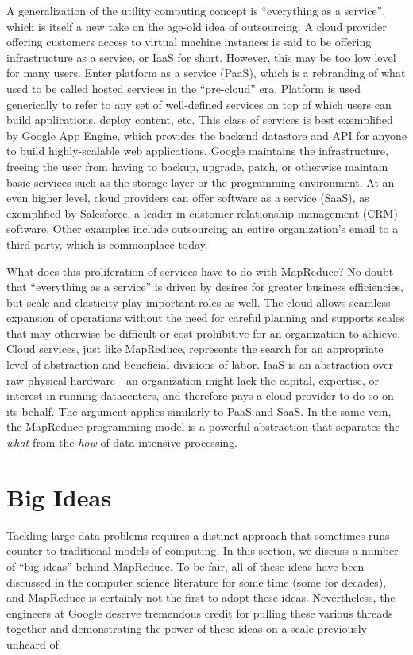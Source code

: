 A generalization of the utility computing concept is ``everything as a
service'', which is itself a new take on the age-old idea of
outsourcing.  A cloud provider offering customers access to virtual
machine instances is said to be offering infrastructure as a service,
or IaaS for short.  However, this may be too low level for many users.
Enter platform as a service (PaaS), which is a rebranding of what used
to be called hosted services in the ``pre-cloud'' era.  Platform is
used generically to refer to any set of well-defined services on top
of which users can build applications, deploy content, etc.  This
class of services is best exemplified by Google App Engine, which
provides the backend datastore and API for anyone to build
highly-scalable web applications.  Google maintains the
infrastructure, freeing the user from having to backup, upgrade,
patch, or otherwise maintain basic services such as the storage layer
or the programming environment.  At an even higher level, cloud
providers can offer software as a service (SaaS), as exemplified by
Salesforce, a leader in customer relationship management (CRM)
software.  Other examples include outsourcing an entire organization's
email to a third party, which is commonplace today.

What does this proliferation of services have to do with MapReduce?
No doubt that ``everything as a service'' is driven by desires for
greater business efficiencies, but scale and elasticity play important
roles as well.  The cloud allows seamless expansion of operations
without the need for careful planning and supports scales that may
otherwise be difficult or cost-prohibitive for an organization to
achieve.  Cloud services, just like MapReduce, represents the search
for an appropriate level of abstraction and beneficial divisions of
labor.  IaaS is an abstraction over raw physical hardware---an
organization might lack the capital, expertise, or interest in running
datacenters, and therefore pays a cloud provider to do so on its
behalf.  The argument applies similarly to PaaS and SaaS.  In the same
vein, the MapReduce programming model is a powerful abstraction that
separates the {\it what} from the {\it how} of data-intensive
processing.

\section{Big Ideas}

Tackling large-data problems requires a distinct approach that
sometimes runs counter to traditional models of computing.  In this
section, we discuss a number of ``big ideas'' behind MapReduce.  To be
fair, all of these ideas have been discussed in the computer science
literature for some time (some for decades), and MapReduce is
certainly not the first to adopt these ideas.  Nevertheless, the
engineers at Google deserve tremendous credit for pulling these
various threads together and demonstrating the power of these ideas on
a scale previously unheard of.

